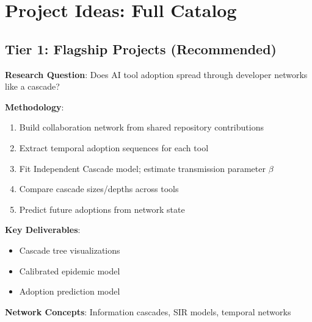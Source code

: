 \documentclass[11pt,letterpaper]{article}
\begin{document}
\section{Project Ideas: Full Catalog}

\subsection{Tier 1: Flagship Projects (Recommended)}

\begin{tcolorbox}[colback=green!5,colframe=green!50!black,title=Project 1A: Information Cascades in AI Tool Adoption]
\textbf{Research Question}: Does AI tool adoption spread through developer networks like a cascade?

\textbf{Methodology}:
\begin{enumerate}
    \item Build collaboration network from shared repository contributions
    \item Extract temporal adoption sequences for each tool
    \item Fit Independent Cascade model; estimate transmission parameter $\beta$
    \item Compare cascade sizes/depths across tools
    \item Predict future adoptions from network state
\end{enumerate}

\textbf{Key Deliverables}:
\begin{itemize}
    \item Cascade tree visualizations
    \item Calibrated epidemic model
    \item Adoption prediction model
\end{itemize}

\textbf{Network Concepts}: Information cascades, SIR models, temporal networks
\end{tcolorbox}
\end{document}
